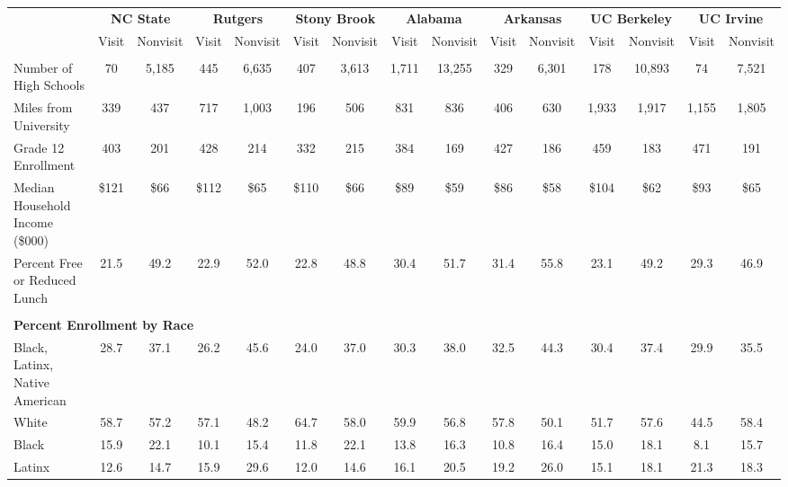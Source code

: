 \begin{tabular*}{\linewidth}{@{\extracolsep{\fill} } lcccccccccccccc}%
&\multicolumn{2}{c}{\bfseries NC State}&\multicolumn{2}{c}{\bfseries Rutgers}&\multicolumn{2}{c}{\bfseries Stony Brook}&\multicolumn{2}{c}{\bfseries Alabama}&\multicolumn{2}{c}{\bfseries Arkansas}&\multicolumn{2}{c}{\bfseries UC Berkeley}&\multicolumn{2}{c}{\bfseries UC Irvine}\\%
&Visit&\multicolumn{1}{l}{Nonvisit}&Visit&\multicolumn{1}{l}{Nonvisit}&Visit&\multicolumn{1}{l}{Nonvisit}&Visit&\multicolumn{1}{l}{Nonvisit}&Visit&\multicolumn{1}{l}{Nonvisit}&Visit&\multicolumn{1}{l}{Nonvisit}&Visit&\multicolumn{1}{l}{Nonvisit}\\%
\hline%
&&&&&&&&&&&&&&\\%
\hspace{0cm}Number of High Schools&70&5,185&445&6,635&407&3,613&1,711&13,255&329&6,301&178&10,893&74&7,521\\%
\hspace{0cm}Miles from University&339&437&717&1,003&196&506&831&836&406&630&1,933&1,917&1,155&1,805\\%
\hspace{0cm}Grade 12 Enrollment&403&201&428&214&332&215&384&169&427&186&459&183&471&191\\%
\hspace{0cm}Median Household Income (\$000)&\$121&\$66&\$112&\$65&\$110&\$66&\$89&\$59&\$86&\$58&\$104&\$62&\$93&\$65\\%
\hspace{0cm}Percent Free or Reduced Lunch&21.5&49.2&22.9&52.0&22.8&48.8&30.4&51.7&31.4&55.8&23.1&49.2&29.3&46.9\\%
&&&&&&&&&&&&&&\\%
\multicolumn{15}{l}{\bfseries Percent Enrollment by Race}\\%
\hspace{0.2cm}Black, Latinx, Native American&28.7&37.1&26.2&45.6&24.0&37.0&30.3&38.0&32.5&44.3&30.4&37.4&29.9&35.5\\%
\hspace{0.2cm}White&58.7&57.2&57.1&48.2&64.7&58.0&59.9&56.8&57.8&50.1&51.7&57.6&44.5&58.4\\%
\hspace{0.2cm}Black&15.9&22.1&10.1&15.4&11.8&22.1&13.8&16.3&10.8&16.4&15.0&18.1&8.1&15.7\\%
\hspace{0.2cm}Latinx&12.6&14.7&15.9&29.6&12.0&14.6&16.1&20.5&19.2&26.0&15.1&18.1&21.3&18.3\\%

\end{tabular*}
